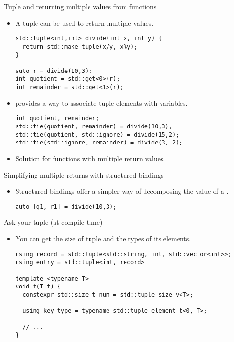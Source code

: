 \begin{frame}[t,fragile]{Tuple and returning multiple values from functions}
  \begin{itemize}
    \item A tuple can be used to return multiple values.
\begin{lstlisting}
std::tuple<int,int> divide(int x, int y) {
  return std::make_tuple(x/y, x%y);
}

auto r = divide(10,3);
int quotient = std::get<0>(r);
int remainder = std::get<1>(r);
\end{lstlisting}

    \item {} provides a way to associate tuple elements
          with variables.
\begin{lstlisting}
int quotient, remainder;
std::tie(quotient, remainder) = divide(10,3);
std::tie(quotient, std::ignore) = divide(15,2);
std::tie(std::ignore, remainder) = divide(3, 2);
\end{lstlisting}

    \item Solution for functions with multiple return values.
  \end{itemize}
\end{frame}

\begin{frame}[t,fragile]{Simplifying multiple returns with structured bindings}
\begin{itemize}
  \item Structured bindings offer a simpler way of decomposing
        the value of a .
\begin{lstlisting}
auto [q1, r1] = divide(10,3);
\end{lstlisting}
\end{itemize}
\end{frame}

\begin{frame}[t,fragile]{Ask your tuple (at compile time)}
  \begin{itemize}
    \item You can get the size of tuple and the types of its elements.
\begin{lstlisting}
using record = std::tuple<std::string, int, std::vector<int>>;
using entry = std::tuple<int, record>

template <typename T>
void f(T t) {
  constexpr std::size_t num = std::tuple_size_v<T>;

  using key_type = typename std::tuple_element_t<0, T>;

  // ...
}
\end{lstlisting}
  \end{itemize}
\end{frame}

